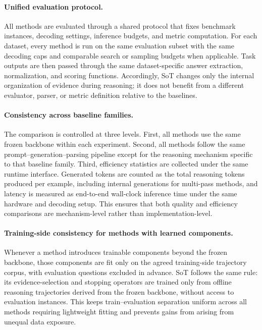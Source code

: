 \paragraph{Unified evaluation protocol.}
All methods are evaluated through a shared protocol that fixes benchmark instances, decoding settings, inference budgets, and metric computation.
For each dataset, every method is run on the same evaluation subset with the same decoding caps and comparable search or sampling budgets when applicable.
Task outputs are then passed through the same dataset-specific answer extraction, normalization, and scoring functions.
Accordingly, SoT changes only the internal organization of evidence during reasoning; it does not benefit from a different evaluator, parser, or metric definition relative to the baselines.

\paragraph{Consistency across baseline families.}
The comparison is controlled at three levels.
First, all methods use the same frozen backbone within each experiment.
Second, all methods follow the same prompt--generation--parsing pipeline except for the reasoning mechanism specific to that baseline family.
Third, efficiency statistics are collected under the same runtime interface.
Generated tokens are counted as the total reasoning tokens produced per example, including internal generations for multi-pass methods, and latency is measured as end-to-end wall-clock inference time under the same hardware and decoding setup.
This ensures that both quality and efficiency comparisons are mechanism-level rather than implementation-level.

\paragraph{Training-side consistency for methods with learned components.}
Whenever a method introduces trainable components beyond the frozen backbone, those components are fit only on the agreed training-side trajectory corpus, with evaluation questions excluded in advance.
SoT follows the same rule: its evidence-selection and stopping operators are trained only from offline reasoning trajectories derived from the frozen backbone, without access to evaluation instances.
This keeps train--evaluation separation uniform across all methods requiring lightweight fitting and prevents gains from arising from unequal data exposure.

